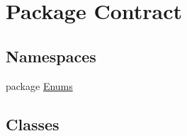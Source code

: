 \hypertarget{namespace_contract}{}\section{Package Contract}
\label{namespace_contract}
\subsection*{Namespaces}
\begin{DoxyCompactItemize}
\item 
package \hyperlink{namespace_contract_1_1_enums}{Enums}
\end{DoxyCompactItemize}
\subsection*{Classes}

